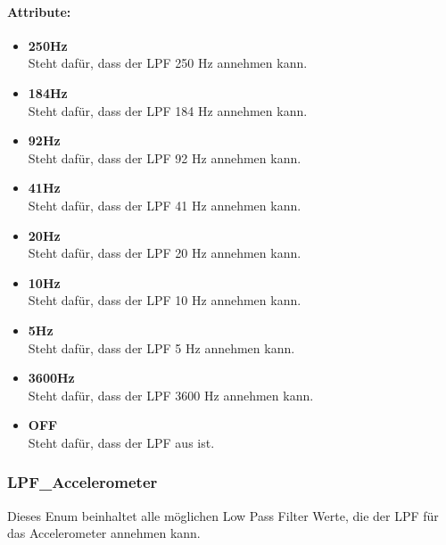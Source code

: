 \documentclass[a4paper,12pt]{article}
\begin{document}
\paragraph{Attribute:}
\begin{itemize}
	\item \textbf{250Hz}\\Steht dafür, dass der LPF 250 Hz annehmen kann.
	\item \textbf{184Hz}\\Steht dafür, dass der LPF 184 Hz annehmen kann.
	\item \textbf{92Hz}\\Steht dafür, dass der LPF 92 Hz annehmen kann.
	\item \textbf{41Hz}\\Steht dafür, dass der LPF 41 Hz annehmen kann.
	\item \textbf{20Hz}\\Steht dafür, dass der LPF 20 Hz annehmen kann.
	\item \textbf{10Hz}\\Steht dafür, dass der LPF 10 Hz annehmen kann.
	\item \textbf{5Hz}\\Steht dafür, dass der LPF 5 Hz annehmen kann.
	\item \textbf{3600Hz}\\Steht dafür, dass der LPF 3600 Hz annehmen kann.
	\item \textbf{OFF}\\Steht dafür, dass der LPF aus ist.
\end{itemize}


\subsubsection{LPF\_Accelerometer}
Dieses Enum beinhaltet alle möglichen Low Pass Filter Werte, die der LPF für das Accelerometer annehmen kann.
\end{document}
